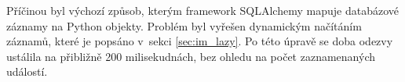 Příčinou byl výchozí způsob, kterým framework SQLAlchemy mapuje databázové záznamy na Python objekty. Problém byl vyřešen dynamickým načítáním záznamů, které je popsáno v~sekci \ref{sec:im_lazy}. Po této úpravě se doba odezvy ustálila na přibližně 200 milisekudnách, bez ohledu na počet zaznamenaných událostí.







